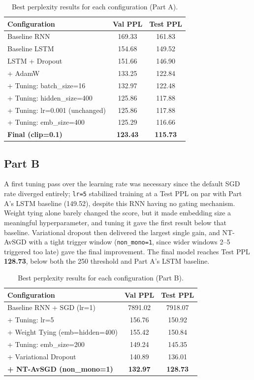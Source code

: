 \documentclass[a4paper]{article}
\begin{document}
\begin{table}[h]
\caption{Best perplexity results for each configuration (Part A).}
\label{tab:parta}
\centering
\begin{tabular}{lcc}
\hline
\textbf{Configuration} & \textbf{Val PPL} & \textbf{Test PPL} \\
\hline
Baseline RNN                & 169.33 & 161.83 \\
Baseline LSTM                & 154.68 & 149.52 \\
LSTM + Dropout               & 151.66 & 146.90 \\
+ AdamW                      & 133.25 & 122.84 \\
+ Tuning: batch\_size=16     & 132.97 & 122.48 \\
+ Tuning: hidden\_size=400   & 125.86 & 117.88 \\
+ Tuning: lr=0.001 (unchanged) & 125.86 & 117.88 \\
+ Tuning: emb\_size=400      & 125.29 & 116.66 \\
\textbf{Final (clip=0.1)}   & \textbf{123.43} & \textbf{115.73} \\
\hline
\end{tabular}
\end{table}

\subsection{Part B}

A first tuning pass over the learning rate was necessary since the default SGD rate diverged entirely; \texttt{lr=5} stabilized training at a Test PPL on par with Part A's LSTM baseline (149.52), despite this RNN having no gating mechanism. Weight tying alone barely changed the score, but it made embedding size a meaningful hyperparameter, and tuning it gave the first result below that baseline. Variational dropout then delivered the largest single gain, and NT-AvSGD with a tight trigger window (\texttt{non\_mono=1}, since wider windows 2--5 triggered too late) gave the final improvement. The final model reaches Test PPL \textbf{128.73}, below both the 250 threshold and Part A's LSTM baseline.

\begin{table}[h]
\caption{Best perplexity results for each configuration (Part B).}
\label{tab:partb}
\centering
\begin{tabular}{lcc}
\hline
\textbf{Configuration} & \textbf{Val PPL} & \textbf{Test PPL} \\
\hline
Baseline RNN + SGD (lr=1)        & 7891.02 & 7918.07 \\
+ Tuning: lr=5                   & 156.76  & 150.92 \\
+ Weight Tying (emb=hidden=400)  & 155.42  & 150.84 \\
+ Tuning: emb\_size=200          & 149.24  & 145.35 \\
+ Variational Dropout            & 140.89  & 136.01 \\
\textbf{+ NT-AvSGD (non\_mono=1)} & \textbf{132.97} & \textbf{128.73} \\
\hline
\end{tabular}
\end{table}




\end{document}
